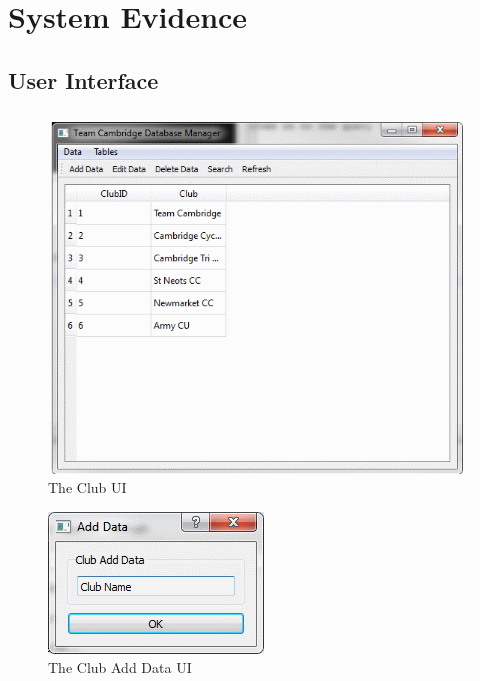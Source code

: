 \section{System Evidence}

\subsection{User Interface}

\clearpage

\begin{figure}
\includegraphics[width=\textwidth]{./Maintenance/UI/Club.png}
\caption{The Club UI} \label{fig:club_UI}
\end{figure}

\begin{figure}
\includegraphics[width=\textwidth]{./Maintenance/UI/ClubAD.png}
\caption{The Club Add Data UI} \label{fig:ClubAD_UI}
\end{figure}

